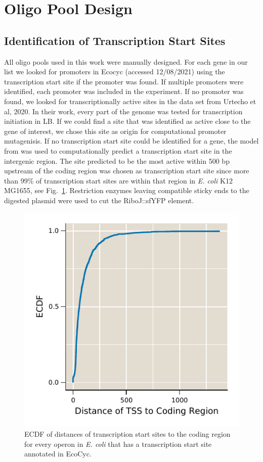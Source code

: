 \section{Oligo Pool Design} \label{sec:oligo_pool}
\subsection{Identification of Transcription Start Sites}
All oligo pools used in this work were manually designed. For each gene in our list we looked for promoters in Ecocyc \cite{keseler2010ecocyc} (accessed 12/08/2021) using the transcription start site if the promoter was found. If multiple promoters were identified, each promoter was included in the experiment. If no promoter was found, we looked for transcriptionally active sites in the data set from Urtecho et al, 2020\cite{urtecho2020genome}. In their work, every part of the genome was tested for transcription initiation in LB. If we could find a site that was identified as active close to the gene of interest, we chose this site as origin for computational promoter mutagenisis. If no transcription start site could be identified for a gene, the model from \cite{la2021automated} was used to computationally predict a transcription start site in the intergenic region. The site predicted to be the most active within 500 bp upstream of the coding region was chosen as transcription start site since more than 99\% of transcription start sites are within that region in \textit{E. coli} K12 MG1655, see Fig.~\ref{fig:tss_distance}. Restriction enzymes leaving compatible sticky ends to the digested plasmid were used to cut the RiboJ::sfYFP element.  

\begin{figure}
    \centering
    \includegraphics{../figures/tss_CR_distance.pdf}
    \caption{ECDF of distances of transcription start sites to the coding region for every operon in \textit{E. coli} that has a transcription start site annotated in EcoCyc. }
    \label{fig:tss_distance}
\end{figure}


